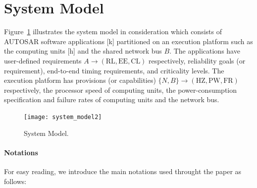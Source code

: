 \section{System Model}\label{sec_system}
Figure~\ref{fig_system} illustrates the system model in consideration which consists of AUTOSAR software applications [k] partitioned on an execution platform such as the computing units [h] and the shared network bus $B$. The applications have user-defined requirements $A\rightarrow (\mathrm{RL,EE,CL})$ respectively, reliability goals (or requirement), end-to-end timing requirements, and criticality levels. The execution platform has  provisions (or capabilities) $\{N,B\}\rightarrow (\mathrm{HZ,PW,FR})$ respectively, the processor speed of computing units, the power-consumption specification and failure rates of computing units and the network bus.
 \begin{figure}[!h]
	\centering
	\texttt{[image: system\_model2]}%
	\caption{System Model.}
	\label{fig_system}
\end{figure}

\paragraph{Notations} For easy reading, we introduce the main notations used throught the paper as follows:

